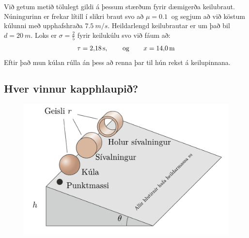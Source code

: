 Við getum metið tölulegt gildi á þessum stærðum fyrir dæmigerða keilubraut. Núningurinn er frekar lítill í slikri braut svo að $\mu = \SI{0.1}{}$ og segjum að við köstum kúlunni með upphafshraða $\SI{7.5}{m/s}$. Heildarlengd keilubrautar er um það bil $d = \SI{20}{m}$. Loks er $\sigma = \frac{2}{5}$ fyrir keilukúlu svo við fáum að:
\begin{align*}
    \tau = \SI{2.18}{s}, \hspace{0.75cm} \text{og} \hspace{0.75cm} x = \SI{14.0}{m}
\end{align*}
Eftir það mun kúlan rúlla án þess að renna þar til hún rekst á keilupinnana. 


\subsection*{Hver vinnur kapphlaupið?}

\begin{figure}[H]
    \centering
    \includegraphics[scale=0.5]{figures/rullakeppni.pdf}
\end{figure}

